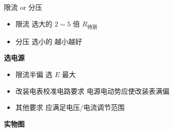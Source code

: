 限流 or 分压
\begin{itemize}
\item 限流 选大的 \qquad $2\sim5$ 倍 $R_{\text{待测}}$
\item 分压 选小的 \qquad 越小越好
\end{itemize}
\textbf{选电源}

\begin{itemize}
\item 限流半偏 \quad 选 $E$ 最大
\item 改装电表校准电路要求 \quad 电源电动势应使改装表满偏
\item 其他要求 \quad 应满足电压/电流调节范围
\end{itemize}
\textbf{实物图}

